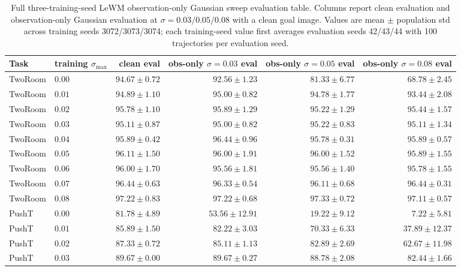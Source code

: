 \documentclass[10pt]{article}
\newcommand{\stdmax}{\ensuremath{\sigma_{\max}}}
\begin{document}
\begin{table}[H]
\centering
\caption{Full three-training-seed LeWM observation-only Gaussian sweep evaluation table. Columns report clean evaluation and observation-only Gaussian evaluation at $\sigma=0.03/0.05/0.08$ with a clean goal image. Values are mean $\pm$ population std across training seeds 3072/3073/3074; each training-seed value first averages evaluation seeds 42/43/44 with 100 trajectories per evaluation seed.}
\label{tab:appendix-gaussian-sweep}
\footnotesize
\setlength{\tabcolsep}{3pt}
\renewcommand{\arraystretch}{0.90}
\begin{tabular}{llrrrr}
\toprule
Task & training \stdmax{} & clean eval & obs-only $\sigma=0.03$ eval & obs-only $\sigma=0.05$ eval & obs-only $\sigma=0.08$ eval \\
\midrule
TwoRoom & $0.00$ & $94.67 \pm 0.72$ & $92.56 \pm 1.23$ & $81.33 \pm 6.77$ & $68.78 \pm 2.45$ \\
TwoRoom & $0.01$ & $94.89 \pm 1.10$ & $95.00 \pm 0.82$ & $94.78 \pm 1.77$ & $93.44 \pm 2.08$ \\
TwoRoom & $0.02$ & $95.78 \pm 1.10$ & $95.89 \pm 1.29$ & $95.22 \pm 1.29$ & $95.44 \pm 1.57$ \\
TwoRoom & $0.03$ & $95.11 \pm 0.87$ & $95.00 \pm 0.82$ & $95.22 \pm 0.83$ & $95.11 \pm 1.34$ \\
TwoRoom & $0.04$ & $95.89 \pm 0.42$ & $96.44 \pm 0.96$ & $95.78 \pm 0.31$ & $95.89 \pm 0.57$ \\
TwoRoom & $0.05$ & $96.11 \pm 1.50$ & $96.00 \pm 1.91$ & $96.00 \pm 1.52$ & $95.89 \pm 1.55$ \\
TwoRoom & $0.06$ & $96.00 \pm 1.70$ & $95.56 \pm 1.81$ & $95.56 \pm 1.40$ & $95.78 \pm 1.55$ \\
TwoRoom & $0.07$ & $96.44 \pm 0.63$ & $96.33 \pm 0.54$ & $96.11 \pm 0.68$ & $96.44 \pm 0.31$ \\
TwoRoom & $0.08$ & $97.22 \pm 0.83$ & $97.22 \pm 0.68$ & $97.33 \pm 0.72$ & $97.11 \pm 0.57$ \\
\addlinespace[2pt]
PushT & $0.00$ & $81.78 \pm 4.89$ & $53.56 \pm 12.91$ & $19.22 \pm 9.12$ & $7.22 \pm 5.81$ \\
PushT & $0.01$ & $85.89 \pm 1.50$ & $82.22 \pm 3.03$ & $70.33 \pm 6.33$ & $37.89 \pm 12.37$ \\
PushT & $0.02$ & $87.33 \pm 0.72$ & $85.11 \pm 1.13$ & $82.89 \pm 2.69$ & $62.67 \pm 11.98$ \\
PushT & $0.03$ & $89.67 \pm 0.00$ & $89.67 \pm 0.27$ & $88.78 \pm 2.08$ & $82.44 \pm 1.66$ \\

\end{tabular}
\end{table}
\end{document}
